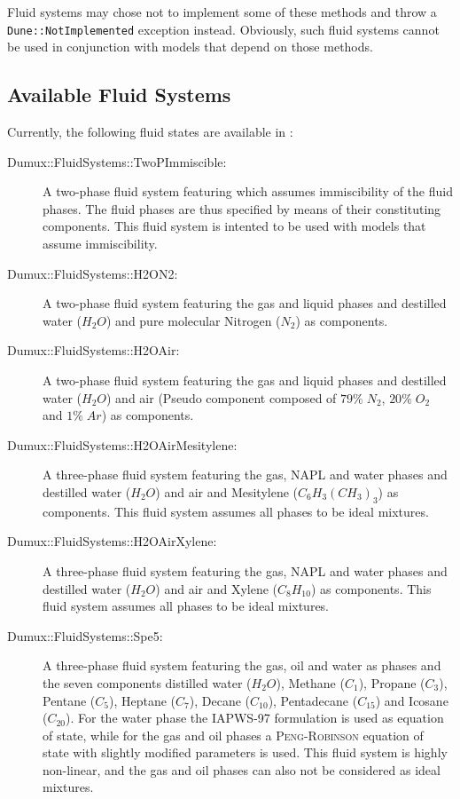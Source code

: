 Fluid systems may chose not to implement some of these methods and
throw a \texttt{Dune::NotImplemented} exception instead. Obviously,
such fluid systems cannot be used in conjunction with models that
depend on those methods.

\subsection{Available Fluid Systems}
Currently, the following fluid states are available in \Dumux:
\begin{description}
\item[Dumux::FluidSystems::TwoPImmiscible:] A two-phase fluid
  system featuring which assumes immiscibility of the fluid
  phases. The fluid phases are thus specified by means of their
  constituting components. This fluid system is intented to be used
  with models that assume immiscibility.
\item[Dumux::FluidSystems::H2ON2:] A two-phase fluid system
  featuring the gas and liquid phases and destilled water ($H_2O$) and
  pure molecular Nitrogen ($N_2$) as components.
\item[Dumux::FluidSystems::H2OAir:] A two-phase fluid system
  featuring the gas and liquid phases and destilled water ($H_2O$) and
  air (Pseudo component composed of $79\%\;N_2$, $20\%\;O_2$ and
  $1\%\;Ar$) as components.
\item[Dumux::FluidSystems::H2OAirMesitylene:] A three-phase fluid
  system featuring the gas, NAPL and water phases and destilled water
  ($H_2O$) and air and Mesitylene ($C_6H_3(CH_3)_3$) as components. This fluid
  system assumes all phases to be ideal mixtures.
\item[Dumux::FluidSystems::H2OAirXylene:] A three-phase fluid
  system featuring the gas, NAPL and water phases and destilled water
  ($H_2O$) and air and Xylene ($C_8H_{10}$) as components. This fluid
  system assumes all phases to be ideal mixtures.
\item[Dumux::FluidSystems::Spe5:] A three-phase fluid system
  featuring the gas, oil and water as phases and the seven components
  distilled water ($H_2O$), Methane ($C_1$), Propane ($C_3$), Pentane
  ($C_5$), Heptane ($C_7$), Decane ($C_{10}$), Pentadecane
  ($C_{15}$) and Icosane ($C_{20}$). For the water phase the IAPWS-97
  formulation is used as equation of state, while for the gas and oil
  phases a \textsc{Peng}-\textsc{Robinson} equation of state with
  slightly modified parameters is used. This fluid system is highly
  non-linear, and the gas and oil phases can also not be considered as
  ideal mixtures. %
\end{description}

